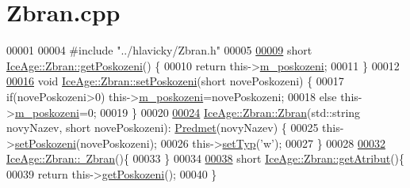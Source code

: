 \hypertarget{Zbran_8cpp_source}{}\section{Zbran.\+cpp}
\label{Zbran_8cpp_source}

\begin{DoxyCode}
00001 
00004 \textcolor{preprocessor}{#include "../hlavicky/Zbran.h"}
00005 
\hypertarget{Zbran_8cpp_source.tex_l00009}{}\hyperlink{classIceAge_1_1Zbran_ad12a2508c6983fad25c307a8b0b7d467}{00009} \textcolor{keywordtype}{short} \hyperlink{classIceAge_1_1Zbran_ad12a2508c6983fad25c307a8b0b7d467}{IceAge::Zbran::getPoskozeni}() \{
00010     \textcolor{keywordflow}{return} this->\hyperlink{classIceAge_1_1Zbran_a7a671b3caa7e80a70b5fce3d5b123418}{m\_poskozeni};
00011 \}
00012 
\hypertarget{Zbran_8cpp_source.tex_l00016}{}\hyperlink{classIceAge_1_1Zbran_a1203c7042bea60e97f2032e922bba8f5}{00016} \textcolor{keywordtype}{void} \hyperlink{classIceAge_1_1Zbran_a1203c7042bea60e97f2032e922bba8f5}{IceAge::Zbran::setPoskozeni}(\textcolor{keywordtype}{short} novePoskozeni) \{
00017     \textcolor{keywordflow}{if}(novePoskozeni>0) this->\hyperlink{classIceAge_1_1Zbran_a7a671b3caa7e80a70b5fce3d5b123418}{m\_poskozeni}=novePoskozeni;
00018     \textcolor{keywordflow}{else} this->\hyperlink{classIceAge_1_1Zbran_a7a671b3caa7e80a70b5fce3d5b123418}{m\_poskozeni}=0;
00019 \}
00020 
\hypertarget{Zbran_8cpp_source.tex_l00024}{}\hyperlink{classIceAge_1_1Zbran_a075c0a805d1fa11a79c795dcb65720d5}{00024} \hyperlink{classIceAge_1_1Zbran_a075c0a805d1fa11a79c795dcb65720d5}{IceAge::Zbran::Zbran}(std::string novyNazev, \textcolor{keywordtype}{short} novePoskozeni):
      \hyperlink{classIceAge_1_1Predmet}{Predmet}(novyNazev) \{
00025     this->\hyperlink{classIceAge_1_1Zbran_a1203c7042bea60e97f2032e922bba8f5}{setPoskozeni}(novePoskozeni);
00026     this->\hyperlink{classIceAge_1_1Predmet_af69bf7c4e8cb75493c90deeaa2afd03c}{setTyp}(\textcolor{charliteral}{'w'});
00027 \}
00028 
\hypertarget{Zbran_8cpp_source.tex_l00032}{}\hyperlink{classIceAge_1_1Zbran_abd3e919129605818d5aca1cc4e3c12c7}{00032} \hyperlink{classIceAge_1_1Zbran_abd3e919129605818d5aca1cc4e3c12c7}{IceAge::Zbran::~Zbran}()\{
00033 \}
00034 
\hypertarget{Zbran_8cpp_source.tex_l00038}{}\hyperlink{classIceAge_1_1Zbran_ae5be95775a3d4d3ac85b6a731dc35413}{00038} \textcolor{keywordtype}{short} \hyperlink{classIceAge_1_1Zbran_ae5be95775a3d4d3ac85b6a731dc35413}{IceAge::Zbran::getAtribut}()\{
00039      \textcolor{keywordflow}{return} this->\hyperlink{classIceAge_1_1Zbran_ad12a2508c6983fad25c307a8b0b7d467}{getPoskozeni}();
00040 \}
\end{DoxyCode}
